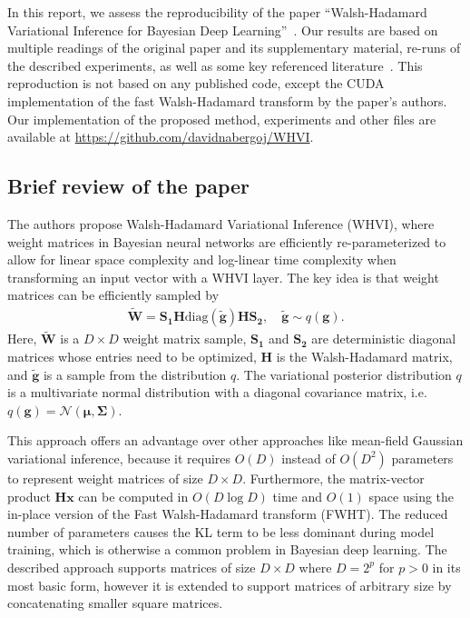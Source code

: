 In this report, we assess the reproducibility of the paper ``Walsh-Hadamard Variational Inference for Bayesian Deep Learning''~\cite{rossi2019walsh}.
Our results are based on multiple readings of the original paper and its supplementary material, re-runs of the described experiments, as well as some key referenced literature~\cite{le2014fastfood, blundell2015weight, fino1976unified, kingma2015variational, rossi2019good}.
This reproduction is not based on any published code, except the CUDA implementation of the fast Walsh-Hadamard transform by the paper's authors.
Our implementation of the proposed method, experiments and other files are available at \url{https://github.com/davidnabergoj/WHVI}.

\subsection{Brief review of the paper}\label{subsec:brief-review-of-the-paper}
The authors propose Walsh-Hadamard Variational Inference (WHVI), where weight matrices in Bayesian neural networks are efficiently re-parameterized to allow for linear space complexity and log-linear time complexity when transforming an input vector with a WHVI layer.
The key idea is that weight matrices can be efficiently sampled by
\begin{align}
    \widetilde{\mathbf{W}} = \mathbf{S_1} \mathbf{H} \mathrm{diag}(\widetilde{\mathbf{g}}) \mathbf{H} \mathbf{S_2},\quad\widetilde{\mathbf{g}} \sim q(\mathbf{g}).
    \label{eqn:weight-sampling}
\end{align}
Here, $\widetilde{\mathbf{W}}$ is a $D \times D$ weight matrix sample, $\mathbf{S_1}$ and $\mathbf{S_2}$ are deterministic diagonal matrices whose entries need to be optimized, $\mathbf{H}$ is the Walsh-Hadamard matrix, and $\widetilde{\mathbf{g}}$ is a sample from the distribution $q$.
The variational posterior distribution $q$ is a multivariate normal distribution with a diagonal covariance matrix, i.e.\ $q(\mathbf{g}) = \mathcal{N}(\mathbf{\mu}, \mathbf{\Sigma})$.

This approach offers an advantage over other approaches like mean-field Gaussian variational inference, because it requires $O(D)$ instead of $O(D^2)$ parameters to represent weight matrices of size $D \times D$.
Furthermore, the matrix-vector product $\mathbf{Hx}$ can be computed in $O(D \log D)$ time and $O(1)$ space using the in-place version of the Fast Walsh-Hadamard transform (FWHT).
The reduced number of parameters causes the KL term to be less dominant during model training, which is otherwise a common problem in Bayesian deep learning.
The described approach supports matrices of size $D \times D$ where $D = 2^p$ for $p > 0$ in its most basic form, however it is extended to support matrices of arbitrary size by concatenating smaller square matrices.

